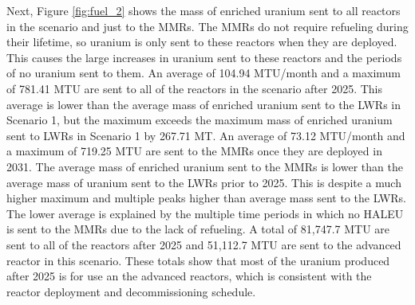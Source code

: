 Next, Figure \ref{fig:fuel_2} shows the mass of enriched uranium sent to all 
reactors in the scenario and just to the \glspl{MMR}. The \glspl{MMR} 
do not require refueling during their lifetime, so uranium is only 
sent to these reactors when they are deployed. This causes the 
large increases in uranium sent to these reactors and the periods of 
no uranium sent to them. An average of 104.94 MTU/month and a maximum 
of 781.41 MTU are sent to all of the reactors in the scenario after 2025. 
This average is lower than the average mass of enriched uranium 
sent to the \glspl{LWR} in Scenario 1, but the maximum exceeds the maximum 
mass of enriched uranium sent to \glspl{LWR} in Scenario 1 by 267.71 MT.
An average of 73.12 MTU/month and a maximum of 719.25 
MTU are sent to the \glspl{MMR} once they are deployed in 2031. The average 
mass of enriched uranium sent to the 
\glspl{MMR} is lower than the average mass of uranium sent to the \glspl{LWR}
prior to 2025. This is despite a much higher maximum and multiple peaks higher
than
average mass sent to the \glspl{LWR}. The lower average is explained by the 
multiple time periods in 
which no \gls{HALEU} is sent to the \glspl{MMR} due to the lack of refueling.
A total of 81,747.7 MTU are sent to all of the reactors after 2025 and 
51,112.7 MTU are sent to the advanced reactor in this 
scenario. These totals show that most of the uranium produced after 2025 is 
for use an the advanced reactors, which is consistent with the reactor 
deployment and decommissioning schedule. 

